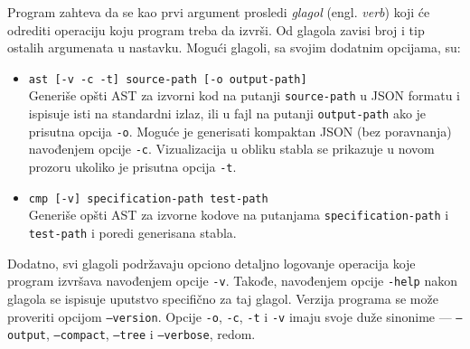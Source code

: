 Program zahteva da se kao prvi argument prosledi \emph{glagol} (engl. \emph{verb}) koji će odrediti operaciju koju program treba da izvrši. Od glagola zavisi broj i tip ostalih argumenata u nastavku. Mogući glagoli, sa svojim dodatnim opcijama, su:
\begin{itemize}
    \item \texttt{ast [-v -c -t] source-path [-o output-path]} \\
    Generiše opšti AST za izvorni kod na putanji \texttt{source-path} u JSON formatu i ispisuje isti na standardni izlaz, ili u fajl na putanji \texttt{output-path} ako je prisutna opcija \texttt{-o}. Moguće je generisati kompaktan JSON (bez poravnanja) navođenjem opcije \texttt{-c}. Vizualizacija u obliku stabla se prikazuje u novom prozoru ukoliko je prisutna opcija \texttt{-t}.
    \item \texttt{cmp [-v] specification-path test-path} \\
    Generiše opšti AST za izvorne kodove na putanjama \texttt{specification-path} i \texttt{test-path} i poredi generisana stabla. 
\end{itemize} 

Dodatno, svi glagoli podržavaju opciono detaljno logovanje operacija koje program izvršava navođenjem opcije \texttt{-v}. Takođe, navođenjem opcije \texttt{-help} nakon glagola se ispisuje uputstvo specifično za taj glagol. Verzija programa se može proveriti opcijom \texttt{--version}. Opcije \texttt{-o}, \texttt{-c}, \texttt{-t} i \texttt{-v} imaju svoje duže sinonime --- \texttt{--output}, \texttt{--compact}, \texttt{--tree} i \texttt{--verbose}, redom.

